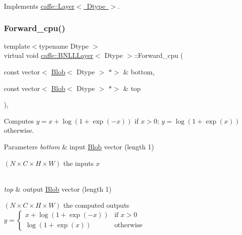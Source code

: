 Implements \mbox{\hyperlink{classcaffe_1_1_layer_a576ac6a60b1e99fe383831f52a6cea77}{caffe\+::\+Layer$<$ Dtype $>$}}.

\mbox{\label{classcaffe_1_1_b_n_l_l_layer_ab1b8dfd185c2d896ede4fa8f9368196b}} 
\subsubsection{\texorpdfstring{Forward\+\_\+cpu()}{Forward\_cpu()}\hspace{0.1cm}{\footnotesize\ttfamily [2/2]}}
{\footnotesize\ttfamily template$<$typename Dtype $>$ \\
virtual void \mbox{\hyperlink{classcaffe_1_1_b_n_l_l_layer}{caffe\+::\+B\+N\+L\+L\+Layer}}$<$ Dtype $>$\+::Forward\+\_\+cpu (\begin{DoxyParamCaption}\item[{const vector$<$ \mbox{\hyperlink{classcaffe_1_1_blob}{Blob}}$<$ Dtype $>$ $\ast$$>$ \&}]{bottom,  }\item[{const vector$<$ \mbox{\hyperlink{classcaffe_1_1_blob}{Blob}}$<$ Dtype $>$ $\ast$$>$ \&}]{top }\end{DoxyParamCaption})\hspace{0.3cm}{\ttfamily [protected]}, {\ttfamily [virtual]}}



Computes $ y = x + \log(1 + \exp(-x)) $ if $ x > 0 $; $ y = \log(1 + \exp(x)) $ otherwise. 


\begin{DoxyParams}{Parameters}
{\em bottom} & input \mbox{\hyperlink{classcaffe_1_1_blob}{Blob}} vector (length 1)
\begin{DoxyEnumerate}
\item $ (N \times C \times H \times W) $ the inputs $ x $ 
\end{DoxyEnumerate}\\
\hline
{\em top} & output \mbox{\hyperlink{classcaffe_1_1_blob}{Blob}} vector (length 1)
\begin{DoxyEnumerate}
\item $ (N \times C \times H \times W) $ the computed outputs $ y = \left\{ \begin{array}{ll} x + \log(1 + \exp(-x)) & \mbox{if } x > 0 \\ \log(1 + \exp(x)) & \mbox{otherwise} \end{array} \right. $ 
\end{DoxyEnumerate}\\
\hline
\end{DoxyParams}


